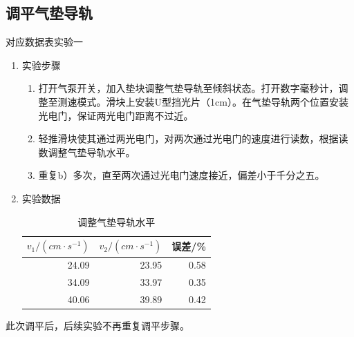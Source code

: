 \documentclass[11pt]{article}
\begin{document}
\subsection{调平气垫导轨}
对应数据表实验一
\begin{enumerate}
    \item 实验步骤
    \begin{enumerate}
        \item 打开气泵开关，加入垫块调整气垫导轨至倾斜状态。打开数字毫秒计，调整至测速模式。滑块上安装U型挡光片（1cm）。在气垫导轨两个位置安装光电门，保证两光电门距离不过近。
        \item 轻推滑块使其通过两光电门，对两次通过光电门的速度进行读数，根据读数调整气垫导轨水平。
        \item 重复b）多次，直至两次通过光电门速度接近，偏差小于千分之五。
    \end{enumerate}
    \item 实验数据
        \begin{table}[H]
          \centering
          \caption{调整气垫导轨水平}
            \begin{tabular}{|r|r|r|}\hline
            $v_{1}/(cm \cdot s^{-1})$ & $v_{2}/(cm \cdot s^{-1})$ & 误差/\% \\\hline
            24.09 & 23.95 & 0.58 \\\hline
            34.09 & 33.97 & 0.35 \\\hline
            40.06 & 39.89 & 0.42 \\\hline
            \end{tabular}%
          \label{tab:addlabel}%
        \end{table}%
\end{enumerate}
此次调平后，后续实验不再重复调平步骤。
\end{document}

